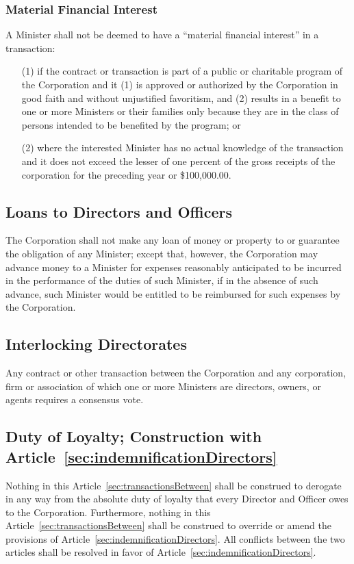 \documentclass[letterpaper,titlepage]{article}
\begin{document}
\subsubsection{Material Financial Interest}
\label{sec:materialFinancial}
A Minister shall not be deemed to have a ``material financial interest'' in a transaction:
\begin{itemize}
    \item[(1)] if the contract or transaction is part of a public or charitable
        program of the Corporation and it (1) is approved or authorized by the
        Corporation in good faith and without unjustified favoritism, and (2)
        results in a benefit to one or more Ministers or their families only
        because they are in the class of persons intended to be benefited by
        the program; or
    \item[(2)] where the interested Minister has no actual knowledge of the
        transaction and it does not exceed the lesser of one percent of the
        gross receipts of the corporation for the preceding year or
        \$100,000.00.
\end{itemize}
\subsection{Loans to Directors and Officers}
\label{sec:loansDirectors}
The Corporation shall not make any loan of money or property to or guarantee the obligation of any Minister; except that, however, the Corporation may advance money to a Minister for expenses reasonably anticipated to be incurred in the performance of the duties of such Minister, if in the absence of such advance, such Minister would be entitled to be reimbursed for such expenses by the Corporation.
\subsection{Interlocking Directorates}
\label{sec:interlockingDirectorates}
Any contract or other transaction between the Corporation and any corporation, firm or association of which one or more Ministers are directors, owners, or agents requires a consensus vote.
\subsection{Duty of Loyalty; Construction with
Article~\ref{sec:indemnificationDirectors}}
\label{sec:dutyLoyalty}
Nothing in this Article~\ref{sec:transactionsBetween} shall be construed to
derogate in any way from the absolute duty of loyalty that every Director and
Officer owes to the Corporation. Furthermore, nothing in this
Article~\ref{sec:transactionsBetween} shall be construed to override or amend
the provisions of Article~\ref{sec:indemnificationDirectors}. All conflicts between the
two articles shall be resolved in favor of
Article~\ref{sec:indemnificationDirectors}.
\end{document}
